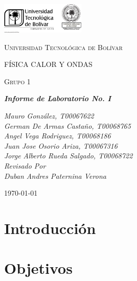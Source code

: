\documentclass[twocolumn, 12pt]{article}
\begin{document}
\begin{titlepage}
    \centering
    \includegraphics[width=0.3\textwidth]{Images/logo_utb.png}\par\vspace{1cm}
    {\scshape\LARGE Universidad Tecnológica de Bolívar \par}
    \vspace{1cm}

    {\scshape\Large FÍSICA CALOR Y ONDAS \par}
    \vspace{.2cm}

    {\scshape\Large Grupo 1 \par}
    \vspace{1cm}
    \slshape {\Large \bfseries{}Informe de Laboratorio No. I\\}
    \vspace{2cm}

    \slshape {\itshape{} Mauro González, T00067622 \\}
    \slshape {\itshape{} German De Armas Castaño, T00068765 \\}
    \slshape {\itshape{} Angel Vega Rodriguez, T00068186 \\}
    \slshape {\itshape{} Juan Jose Osorio Ariza, T00067316 \\}
    \slshape {\itshape{} Jorge Alberto Rueda Salgado, T00068722 \\}
    \vfill
    Revisado Por \\
    Duban Andres Paternina Verona\\
    {\large \today\par}
\end{titlepage}

\section{Introducción}

\section{Objetivos}
\end{document}
